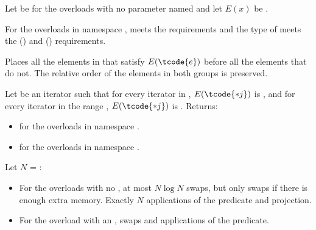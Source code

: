 \begin{itemdescr}
\pnum
Let  be 
for the overloads with no parameter named 
and let $E(x)$ be .

\pnum
\expects
For the overloads in namespace ,
 meets
the  requirements and
the type of  meets
the  () and
 () requirements.

\pnum
\effects
Places all the elements  in 
that satisfy $E(\tcode{e})$ before all the elements that do not.
The relative order of the elements in both groups is preserved.

\pnum
\returns
Let  be an iterator
such that for every iterator  in ,
$E(\tcode{*j})$ is ,
and for every iterator  in the range ,
$E(\tcode{*j})$ is .
Returns:
\begin{itemize}
\item {} for the overloads in namespace .
\item {} for the overloads in namespace .
\end{itemize}


\pnum
\complexity
Let $N$ = :
\begin{itemize}
\item
  For the overloads with no , at most $N \log N$ swaps,
  but only  swaps if there is enough extra memory.
  Exactly $N$ applications of the predicate and projection.
\item
  For the overload with an ,
   swaps and  applications of the predicate.
\end{itemize}
\end{itemdescr}

